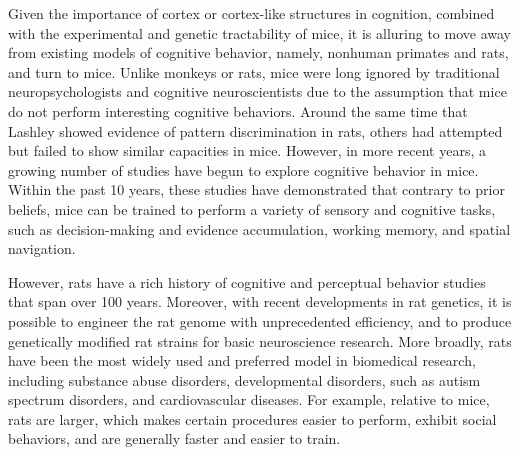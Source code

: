 Given the importance of cortex or cortex-like structures in cognition, combined with the experimental and genetic tractability of mice, it is alluring to move away from existing models of cognitive behavior, namely, nonhuman primates and rats, and turn to mice. Unlike monkeys or rats, mice were long ignored by traditional neuropsychologists and cognitive neuroscientists due to the assumption that mice do not perform interesting cognitive behaviors. Around the same time that Lashley showed evidence of pattern discrimination in rats, others had attempted but failed to show similar capacities in mice\cite{Yerkes1907,Waugh1910}. However, in more recent years, a growing number of studies have begun to explore cognitive behavior in mice. Within the past 10 years, these studies have demonstrated that contrary to prior beliefs, mice can be trained to perform a variety of sensory and cognitive tasks, such as decision-making and evidence accumulation\cite{Morcos2016,Pinto2018, Krumin2018,Lee2020}, working memory\cite{Light2010}, and spatial navigation\cite{Dombeck2007,Harvey2009}. 

However, rats have a rich history of cognitive and perceptual behavior studies that span over 100 years. Moreover, with recent developments in rat genetics, it is possible to engineer the rat genome with unprecedented efficiency\cite{Aitman2008,Geurts2009,Huang2011rats,Tesson2011,Dayton2018}, and to produce genetically modified rat strains for basic neuroscience research\cite{Witten2011,Scott2013,Igarashi2018}. More broadly, rats have been the most widely used and preferred model in biomedical research, including substance abuse disorders, developmental disorders, such as autism spectrum disorders, and cardiovascular diseases\cite{Aitman2008,Ellenbroek2016,Homberg2017}. For example, relative to mice, rats are larger, which makes certain procedures easier to perform, exhibit social behaviors\cite{Viana2010,Bartal2014,Netser2020}, and are generally faster and easier to train\cite{Colacicco2002,Jaramillo2014}.



